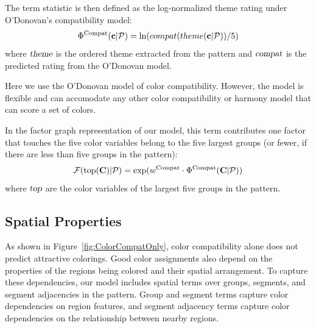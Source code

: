 The term statistic is then defined as the log-normalized theme rating under O'Donovan's compatibility model:
\begin{equation*}
\Phi^{\textrm{Compat}}(\mathbf{c}| \mathcal{P}) = \ln(compat(theme(\mathbf{c}| \mathcal{P}))/5)
\end{equation*}
where $\textsl{theme}$ is the ordered theme extracted from the pattern and $\textsl{compat}$ is the predicted rating from the O'Donovan model.

Here we use the O'Donovan model of color compatibility. However, the model is flexible and can accomodate any other color compatibility or harmony model that can score a set of colors.

In the factor graph representation of our model, this term contributes one factor that touches the five color variables belong to the five largest groups (or fewer, if there are less than five groups in the pattern):
\begin{equation*}
\mathcal{F}(\textrm{top}(\mathbf{C}) | \mathcal{P}) = \exp(w^{\textrm{Compat}} \cdot \Phi^{\textrm{Compat}}(\mathbf{C} | \mathcal{P}))
\end{equation*}
where $\textsl{top}$ are the color variables of the largest five groups in the pattern.


\subsection{Spatial Properties}
\label{sec:spatialCompat}

As shown in Figure~\ref{fig:ColorCompatOnly}, color compatibility alone does not predict attractive colorings. Good color assignments also depend on the properties of the regions being colored and their spatial arrangement. To capture these dependencies, our model includes spatial terms over groups, segments, and segment adjacencies in the pattern. Group and segment terms capture color dependencies on region features, and segment adjacency terms capture color dependencies on the relationship between nearby regions.

